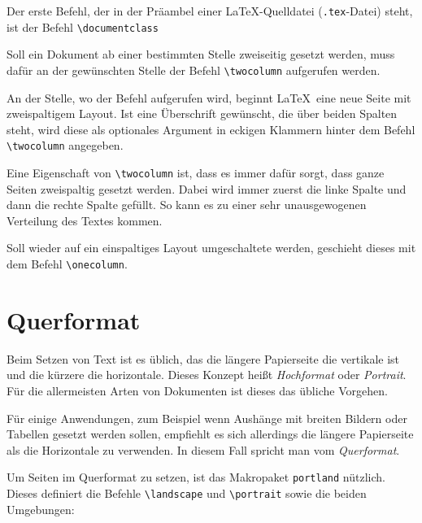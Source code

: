 Der erste Befehl, der in der Präambel einer \LaTeX-Quelldatei (\verb!.tex!-Datei) steht, ist der Befehl \verb!\documentclass!
\begin{document}
Soll ein Dokument ab einer bestimmten Stelle zweiseitig gesetzt werden, muss dafür an der gewünschten Stelle der Befehl \verb!\twocolumn! aufgerufen werden.


An der Stelle, wo der Befehl aufgerufen wird, beginnt \LaTeX\ eine neue Seite mit zweispaltigem Layout. Ist eine Überschrift gewünscht, die über beiden Spalten steht, wird diese als optionales Argument in eckigen Klammern hinter dem Befehl \verb!\twocolumn!
angegeben. 


Eine Eigenschaft von \verb!\twocolumn! ist, dass es immer dafür sorgt, dass ganze Seiten zweispaltig gesetzt werden. Dabei wird immer zuerst die linke 
Spalte und dann die rechte Spalte gefüllt. 
So kann es zu einer sehr unausgewogenen 
Verteilung des Textes kommen.

Soll wieder auf ein einspaltiges Layout umgeschaltete werden, geschieht dieses mit dem Befehl \verb!\onecolumn!.






\section{Querformat}

Beim Setzen von Text ist es üblich,
das die längere Papierseite die vertikale
ist und die kürzere die horizontale.
Dieses Konzept heißt \textsl{Hochformat} 
oder \textsl{Portrait}. Für die 
allermeisten Arten von Dokumenten ist 
dieses das übliche Vorgehen.

Für einige Anwendungen,  zum Beispiel wenn Aushänge mit breiten Bildern oder Tabellen gesetzt werden sollen, empfiehlt es sich allerdings
die längere Papierseite als
die Horizontale zu verwenden. In diesem Fall spricht man vom \textsl{Querformat}.

Um Seiten im Querformat zu setzen, ist das Makropaket
\verb!portland! nützlich. Dieses definiert die Befehle 
\verb!\landscape! und
\verb!\portrait! sowie die beiden Umgebungen:
\end{document}
